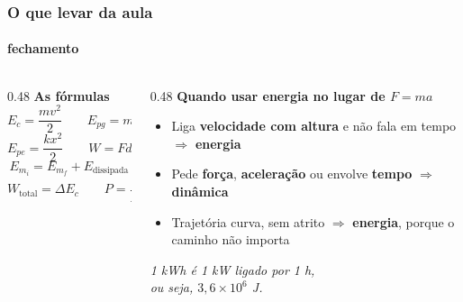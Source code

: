 \documentclass[aspectratio=169,12pt]{beamer}
\begin{document}
\begin{frame}
\frametitle{O que levar da aula}
\framesubtitle{fechamento}

\begin{columns}[T]
\begin{column}{0.48\textwidth}
\textbf{As f\'ormulas}
\[ E_c = \frac{m v^2}{2} \qquad E_{pg} = mgh \]
\[ E_{pe} = \frac{k x^2}{2} \qquad W = F d\cos\theta \]
\[ \boxed{E_{m_i} = E_{m_f} + E_{\text{dissipada}}} \]
\[ W_{\text{total}} = \Delta E_c \qquad
   P = \frac{W}{\Delta t} = F v \]
\end{column}
\begin{column}{0.48\textwidth}
\textbf{Quando usar energia no lugar de $F = ma$}
\begin{itemize}
  \item Liga \textbf{velocidade com altura} e n\~ao fala em tempo
        $\Rightarrow$ \textbf{energia}
  \item Pede \textbf{for\c{c}a}, \textbf{acelera\c{c}\~ao} ou envolve
        \textbf{tempo} $\Rightarrow$ \textbf{din\^amica}
  \item Trajet\'oria curva, sem atrito $\Rightarrow$
        \textbf{energia}, porque o caminho n\~ao importa
\end{itemize}

\vspace{0.4em}
{\color{grafite}\itshape 1 kWh \'e 1 kW ligado por 1 h,\\
ou seja, $3{,}6\times10^6$ J.}
\end{column}
\end{columns}
\end{frame}
\end{document}

